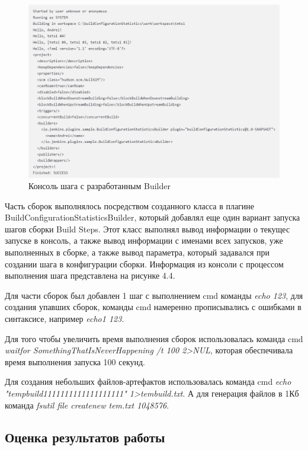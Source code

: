  \begin{figure}[ht!] 
	\center
	\includegraphics [scale=0.57] {my_folder/images//console1}
	\caption{Консоль шага с разработанным Builder} 
	\label{fig:customBuilder}  
\end{figure}

Часть сборок выполнялось посредством созданного класса в плагине BuildConfigurationStatisticsBuilder, который добавлял еще один вариант запуска шагов сборки Build Steps. Этот класс выполнял вывод информации о текущес запуске в консоль, а также вывод информации с именами всех запусков, уже выполненных в сборке, а также вывод параметра, который задавался при создании шага в конфигурации сборки. Информация из консоли с процессом выполнения шага представлена на рисунке 4.4.



Для части сборок был добавлен 1 шаг с выполнением cmd команды  \textit{echo 123}, для создания упавших сборок, команды cmd намеренно прописывались с ошибками в синтаксисе, например  \textit{echo1 123}.

Для того чтобы увеличить время выполнения сборок использовалась команда cmd  \textit{waitfor SomethingThatIsNeverHappening /t 100  2>NUL}, которая обеспечивала время выполнения запуска 100 секунд.

Для создания небольших файлов-артефактов использовалась команда cmd \textit{echo "tempbuild1111111111111111111"  1>tembuild.txt}. А для генерация файлов в 1Кб команда \textit{fsutil file createnew tem.txt 1048576}.

 \subsection{Оценка результатов работы}
 
